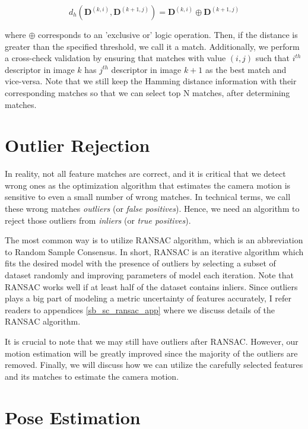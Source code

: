 \documentclass[a4paper]{report}
\numberwithin{figure}{section}
\begin{document}
\begin{equation}
  d_h(\mathbf{D}^{(k,i)},\mathbf{D}^{(k+1,j)}) = \mathbf{D}^{(k,i)} \oplus 
  \mathbf{D}^{(k+1, j)}
\end{equation}

where $\oplus$ corresponds to an 'exclusive or' logic operation. Then, if the 
distance is greater than the specified threshold, we call it a match. 
Additionally, we perform a cross-check validation by ensuring that matches 
with value $(i,j)$ such that $i^{th}$ descriptor in image $k$ has $j^{th}$ 
descriptor in image $k+1$ as the best match and vice-versa.
Note that we still keep the Hamming distance information with their 
corresponding matches so that we can select top N matches, after 
determining matches.


\section{Outlier Rejection} \label{sb_sc_ransac}

In reality, not all feature matches are correct, and it is critical that we 
detect wrong ones as the optimization algorithm that estimates the camera 
motion is sensitive to even a small number of wrong matches. In technical 
terms, we call these wrong matches \textit{outliers} (or \textit{false 
positives}). Hence, we need an algorithm to reject those outliers from 
\textit{inliers} (or \textit{true positives}). 

The most common way is to utilize 
RANSAC 
\parencite{Fischler1981b} algorithm, 
which is an abbreviation to Random Sample Consensus. In short, RANSAC is an 
iterative 
algorithm which fits the desired model with the presence of outliers by 
selecting a subset of dataset randomly and improving parameters of model each 
iteration. Note that RANSAC works well if at least half of the dataset 
contains inliers. Since outliers plays a big part of modeling a metric 
uncertainty of features accurately, I refer readers to appendices 
\ref{sb_sc_ransac_app} 
where we discuss details of the RANSAC algorithm. 


It is crucial to note that we may still have outliers after RANSAC.  However, 
our motion estimation will be greatly improved since the majority of the 
outliers are removed.  Finally, we will discuss how we can utilize the 
carefully selected features and its matches to estimate the camera motion. 


\section{Pose Estimation} \label{sc_pose_estimation}
\end{document}

